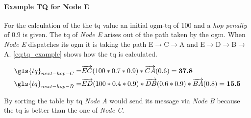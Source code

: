 \paragraph{Example TQ for Node E}
For the calculation of the the \gls{tq} value an initial \gls{ogm}-\gls{tq} of 100 and a \textit{hop penalty} of 0.9 is given.
The \gls{tq} of \textit{Node E} arises out of the path taken by the \gls{ogm}.
When \textit{Node E} dispatches its \gls{ogm} it is taking the path E$\rightarrow$C$\rightarrow$A and E$\rightarrow$D$\rightarrow$B$\rightarrow$A. \vref{eq:tq_example} shows how the \gls{tq} is calculated.

\begin{equation}
\label{eq:tq_example}
\begin{aligned}
\gls{tq} _{next-hop-C} = & \overrightarrow{EC} (100 * 0.7 * 0.9) * \overrightarrow{CA} (0.6) = \textbf{37.8} \\
\gls{tq} _{next-hop-B} = & \overrightarrow{ED} (100 * 0.4 * 0.9) * \overrightarrow{DB} (0.6 * 0.9) * \overrightarrow{BA} (0.8) = \textbf{15.5}
\end{aligned}
\end{equation}

By sorting the table by \gls{tq} \textit{Node A} would send its message via \textit{Node B} because the \gls{tq} is better than the one of \textit{Node C}.
